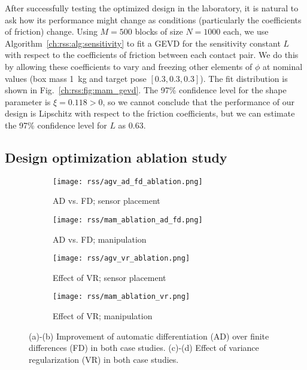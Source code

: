 After successfully testing the optimized design in the laboratory, it is natural to ask how its performance might change as conditions (particularly the coefficients of friction) change. Using $M = 500$ blocks of size $N=1000$ each, we use Algorithm~\ref{ch:rss:alg:sensitivity} to fit a GEVD for the sensitivity constant $L$ with respect to the coefficients of friction between each contact pair. We do this by allowing these coefficients to vary and freezing other elements of $\phi$ at nominal values (box mass \SI{1}{kg} and target pose $[0.3, 0.3, 0.3]$). The fit distribution is shown in Fig.~\ref{ch:rss:fig:mam_gevd}. The 97\% confidence level for the shape parameter is $\xi = 0.118 > 0$, so we cannot conclude that the performance of our design is Lipschitz with respect to the friction coefficients, but we can estimate the 97\% confidence level for $L$ as $0.63$.

\subsection{Design optimization ablation study}\label{ch:rss:ablation}

\begin{figure*}[t]
    \centering
    \begin{subfigure}[t]{0.25\linewidth}
        \centering
        \texttt{[image: rss/agv\_ad\_fd\_ablation.png]}
        \caption{AD vs. FD; sensor placement}
    \end{subfigure}%
    \begin{subfigure}[t]{0.25\linewidth}
        \centering
        \texttt{[image: rss/mam\_ablation\_ad\_fd.png]}
        \caption{AD vs. FD; manipulation}
    \end{subfigure}%
    \begin{subfigure}[t]{0.25\linewidth}
        \centering
        \texttt{[image: rss/agv\_vr\_ablation.png]}
        \caption{Effect of VR; sensor placement}
    \end{subfigure}%
    \begin{subfigure}[t]{0.25\linewidth}
        \centering
        \texttt{[image: rss/mam\_ablation\_vr.png]}
        \caption{Effect of VR; manipulation}
    \end{subfigure}
    \caption{(a)-(b) Improvement of automatic differentiation (AD) over finite differences (FD) in both case studies. (c)-(d) Effect of variance regularization (VR) in both case studies.}
    \label{ch:rss:fig:ablation}
\end{figure*}


